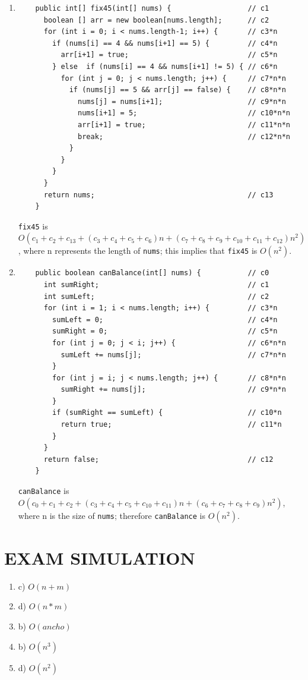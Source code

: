 \documentclass[a4paper,12pt]{article}
\begin{document}
\begin{enumerate}
    \item \begin{Verbatim}
    public int[] fix45(int[] nums) {                  // c1
      boolean [] arr = new boolean[nums.length];      // c2
      for (int i = 0; i < nums.length-1; i++) {       // c3*n
        if (nums[i] == 4 && nums[i+1] == 5) {         // c4*n
          arr[i+1] = true;                            // c5*n
        } else  if (nums[i] == 4 && nums[i+1] != 5) { // c6*n
          for (int j = 0; j < nums.length; j++) {     // c7*n*n
            if (nums[j] == 5 && arr[j] == false) {    // c8*n*n
              nums[j] = nums[i+1];                    // c9*n*n
              nums[i+1] = 5;                          // c10*n*n
              arr[i+1] = true;                        // c11*n*n
              break;                                  // c12*n*n
            }
          }
        }
      }
      return nums;                                    // c13
    }
    \end{Verbatim}
    \texttt{fix45} is $O(c_1+c_2+c_13+(c_3+c_4+c_5+c_6)n+(c_7+c_8+c_9+c_10+c_11+c_12)n^2)$, where n represents the length of \texttt{nums};
    this implies that \texttt{fix45} is $O(n^2)$.
    \item \begin{Verbatim}
    public boolean canBalance(int[] nums) {           // c0
      int sumRight;                                   // c1
      int sumLeft;                                    // c2
      for (int i = 1; i < nums.length; i++) {         // c3*n
        sumLeft = 0;                                  // c4*n
        sumRight = 0;                                 // c5*n
        for (int j = 0; j < i; j++) {                 // c6*n*n
          sumLeft += nums[j];                         // c7*n*n
        }
        for (int j = i; j < nums.length; j++) {       // c8*n*n
          sumRight += nums[j];                        // c9*n*n
        }
        if (sumRight == sumLeft) {                    // c10*n
          return true;                                // c11*n
        }
      }
      return false;                                   // c12
    }
    \end{Verbatim}
    \texttt{canBalance} is $O(c_0+c_1+c_2+(c_3+c_4+c_5+c_10+c_11)n+(c_6+c_7+c_8+c_9)n^2)$, where n is the size of \texttt{nums};
    therefore \texttt{canBalance} is $O(n^2)$.
  \end{enumerate}

  \section{EXAM SIMULATION}
  \begin{enumerate}
    \item c) $O(n+m)$
    \item d) $O(n*m)$
    \item b) $O(ancho)$
    \item b) $O(n^3)$
    \item d) $O(n^2)$
  \end{enumerate}


\end{document}
